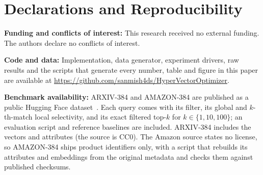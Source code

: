 \documentclass[sigconf,nonacm]{acmart}
\begin{document}
\section*{Declarations and Reproducibility}
\noindent\textbf{Funding and conflicts of interest:} This research received no external funding. The authors declare no conflicts of interest.

\noindent\textbf{Code and data:} Implementation, data generator, experiment drivers, raw results and the scripts that generate every number, table and figure in this paper are available at \url{https://github.com/sanmish4ds/HyperVectorOptimizer}.

\noindent\textbf{Benchmark availability:} ARXIV-384 and AMAZON-384 are published as a public Hugging Face dataset~\cite{hvobench}. Each query comes with its filter, its global and $k$-th-match local selectivity, and its exact filtered top-$k$ for $k\in\{1,10,100\}$; an evaluation script and reference baselines are included. ARXIV-384 includes the vectors and attributes (the source is CC0). The Amazon source states no license, so AMAZON-384 ships product identifiers only, with a script that rebuilds its attributes and embeddings from the original metadata and checks them against published checksums.
\end{document}
